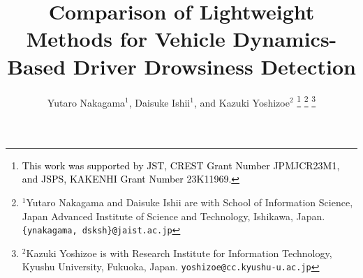 \documentclass[letterpaper, 10 pt, conference]{ieeeconf}  %
\newcommand{\Ishii}[1]{\textcolor{black}{#1}}
\begin{document}





\title{\LARGE \bf
Comparison of Lightweight Methods for Vehicle Dynamics-Based Driver Drowsiness Detection
}

\author{Yutaro Nakagama$^{1}$, Daisuke Ishii$^{1}$, and Kazuki Yoshizoe$^{2}$%
\thanks{\Ishii{This work was supported by JST, CREST Grant Number JPMJCR23M1, and JSPS, KAKENHI Grant Number 23K11969.}}%
\thanks{$^{1}$Yutaro Nakagama and Daisuke Ishii are with School of Information Science, Japan Advanced Institute of Science and Technology, Ishikawa, Japan. 
        {\tt\small \{ynakagama, dsksh\}@jaist.ac.jp}}%
\thanks{$^{2}$Kazuki Yoshizoe is with Research Institute for Information Technology, Kyushu University, Fukuoka, Japan.
        {\tt\small yoshizoe@cc.kyushu-u.ac.jp}}%
}
\end{document}
